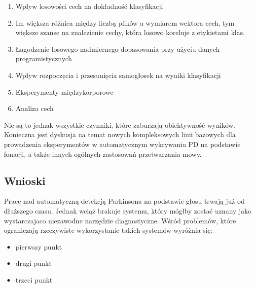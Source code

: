 \begin{enumerate}[label={\alph*)}]
  	\item Wpływ losowości cech na dokładność klasyfikacji
	\item [] Im większa różnica między liczbą plików a wymiarem wektora cech, tym większe szanse na znalezienie cechy, która losowo koreluje z etykietami klas.
  	\item Łagodzenie losowego nadmiernego dopasowania przy użyciu danych programistycznych
	\item Wpływ rozpoczęcia i przesunięcia samogłosek na wyniki klasyfikacji
 	\item Eksperymenty międzykorporowe
	\item Analiza cech
\end{enumerate}



Nie są to jednak wszystkie czynniki, które zaburzają obiektywność wyników. Konieczna jest dyskusja na temat nowych
kompleksowych linii bazowych dla prowadzenia eksperymentów w automatycznym wykrywaniu PD na podstawie fonacji,
a także innych ogólnych zastosowań przetwarzania mowy.


\subsection{Wnioski}
\label{subsec:wnioski}

Prace nad automatyczną detekcją Parkinsona na podstawie głosu trwają już od dłuższego czasu.
Jednak wciąż brakuje systemu, który mógłby zostać uznany jako wystarczajaco niezawodne narzędzie diagnostyczne.
Wśród problemów, które ograniczają rzeczywiste wykorzystanie takich systemów wyróżnia się:

\begin{itemize}
\item pierwszy punkt
\item drugi punkt
\item trzeci punkt
\end{itemize}

